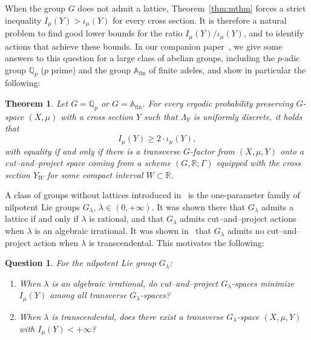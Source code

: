\documentclass{amsart}
\numberwithin{equation}{subsection}
\newtheorem*{thm*}{Theorem}
\newtheorem{que}[thm]{Question}
\theoremstyle{remark}
\begin{document}
When the group \(G\) does not admit a lattice, Theorem~\ref{thm:mthm} forces a strict inequality
\(I_{\mu}\left(Y\right)>\iota_{\mu}\left(Y\right)\) for every cross section. It is therefore a natural problem to find good lower bounds for the ratio \(I_{\mu}\left(Y\right)/\iota_{\mu}\left(Y\right)\), and to identify actions that achieve these bounds. In our companion paper~\cite{AvBjCuII}, we give some answers to this question for a large class of abelian groups, including the \(p\)-adic group \(\mathbb{Q}_{p}\) (\(p\) prime) and the group \(\mathbb{A}_{\mathrm{fin}}\) of finite adeles, and show in particular the following:

\begin{thm*}
Let \(G=\mathbb{Q}_{p}\) or \(G=\mathbb{A}_{\mathrm{fin}}\). For every ergodic probability preserving \(G\)-space \(\left(X,\mu\right)\) with a cross section \(Y\) such that \(\Lambda_{Y}\) is uniformly discrete, it holds that
\[I_{\mu}\left(Y\right)\geq 2\cdot\iota_{\mu}\left(Y\right),\]
with equality if and only if there is a transverse \(G\)-factor from \(\left(X,\mu,Y\right)\) onto a cut--and--project space coming from a scheme \(\left(G,\mathbb{R};\Gamma\right)\) equipped with the cross section \(Y_{W}\) for some compact interval \(W\subset\mathbb{R}\).
\end{thm*}

A class of groups without lattices introduced in~\cite[\S2.4]{BjHa2018} is the one-parameter family of nilpotent Lie groups \(G_{\lambda}\), \(\lambda\in\left(0,+\infty\right)\). It was shown there that \(G_{\lambda}\) admits a lattice if and only if \(\lambda\) is rational, and that \(G_{\lambda}\) admits cut--and--project actions when \(\lambda\) is an algebraic irrational. It was shown in~\cite[Theorem~1.5]{Machado2020} that \(G_{\lambda}\) admits no cut--and--project action when \(\lambda\) is transcendental. This motivates the following:

\begin{que}
For the nilpotent Lie group \(G_{\lambda}\):
\begin{enumerate}
    \item When \(\lambda\) is an algebraic irrational, do cut--and--project \(G_{\lambda}\)-spaces minimize \(I_{\mu}\left(Y\right)\) among all transverse \(G_{\lambda}\)-spaces?
    \item When \(\lambda\) is transcendental, does there exist a transverse \(G_{\lambda}\)-space \(\left(X,\mu,Y\right)\) with \(I_{\mu}\left(Y\right)<+\infty\)?
\end{enumerate}
\end{que}
\end{document}
